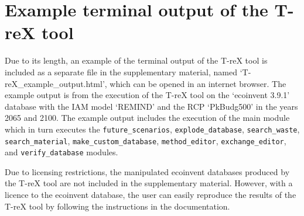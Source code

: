 \documentclass{article}
\renewcommand{\texttt}[1]{{\ttfamily\small\nolinkurl{#1}}}
\begin{document}
\clearpage

\section{Example terminal output of the T-reX tool}

Due to its length, an example of the terminal output of the T-reX tool is included as a separate file in the supplementary material, named `T-reX\_example\_output.html', which can be opened in an internet browser. The example output is from the execution of the T-reX tool on the `ecoinvent 3.9.1' database with the IAM model `REMIND' and the RCP `PkBudg500' in the years 2065 and 2100. The example output includes the execution of the main module which in turn executes the \texttt{future\_scenarios}, \texttt{explode\_database}, \texttt{search\_waste}, \texttt{search\_material}, \texttt{make\_custom\_database}, \texttt{method\_editor}, \texttt{exchange\_editor}, and \texttt{verify\_database} modules.

Due to licensing restrictions, the manipulated ecoinvent databases produced by the T-reX tool are not included in the supplementary material. However, with a licence to the ecoinvent database, the user can easily reproduce the results of the T-reX tool by following the instructions in the documentation.

\clearpage



\end{document}
